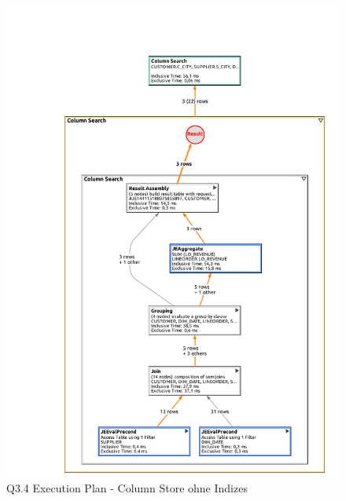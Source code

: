 \begin{figure}[H]
	\centering
	\includegraphics[width=\textwidth]{images/col_q34_no.pdf}
	\caption{Q3.4 Execution Plan - Column Store ohne Indizes}\label{exec:q3.4-col-no}
\end{figure}

